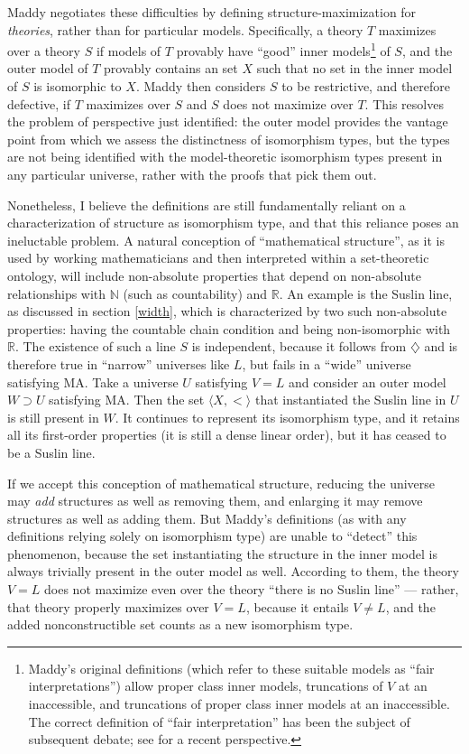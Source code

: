 \documentclass[letterpaper,12pt]{article}
\newcommand{\N}{\mathbb{N}}
\newcommand{\R}{\mathbb{R}}
\begin{document}
Maddy negotiates these difficulties by defining structure-maximization for \emph{theories}, rather than for particular models. Specifically, a theory $T$ maximizes over a theory $S$ if models of $T$ provably have ``good'' inner models\footnote{Maddy's original definitions (which refer to these suitable models as ``fair interpretations'') allow proper class inner models, truncations of $V$ at an inaccessible, and truncations of proper class inner models at an inaccessible. The correct definition of ``fair interpretation'' has been the subject of subsequent debate; see \cite{incurvati2016restrictiveness} for a recent perspective.} of $S$, and the outer model of $T$ provably contains an set $X$ such that no set in the inner model of $S$ is isomorphic to $X$. Maddy then considers $S$ to be restrictive, and therefore defective, if $T$ maximizes over $S$ and $S$ does not maximize over $T$. This resolves the problem of perspective just identified: the outer model provides the vantage point from which we assess the distinctness of isomorphism types, but the types are not being identified with the model-theoretic isomorphism types present in any particular universe, rather with the proofs that pick them out.

Nonetheless, I believe the definitions are still fundamentally reliant on a characterization of structure as isomorphism type, and that this reliance poses an ineluctable problem. A natural conception of ``mathematical structure'', as it is used by working mathematicians and then interpreted within a set-theoretic ontology, will include non-absolute properties that depend on non-absolute relationships with $\N$ (such as countability) and $\R$. An example is the Suslin line, as discussed in section \ref{width}, which is characterized by two such non-absolute properties: having the countable chain condition and being non-isomorphic with $\R$. The existence of such a line $S$ is independent, because it follows from $\diamondsuit$ and is therefore true in ``narrow'' universes like $L$, but fails in a ``wide'' universe satisfying $\mathrm{MA}$. Take a universe $U$ satisfying $V=L$ and consider an outer model $W \supset U$ satisfying $\mathrm{MA}$. Then the set $\langle X, < \rangle$ that instantiated the Suslin line in $U$ is still present in $W$. It continues to represent its isomorphism type, and it retains all its first-order properties (it is still a dense linear order), but it has ceased to be a Suslin line.

If we accept this conception of mathematical structure, reducing the universe may \emph{add} structures as well as removing them, and enlarging it may remove structures as well as adding them. But Maddy's definitions (as with any definitions relying solely on isomorphism type) are unable to ``detect'' this phenomenon, because the set instantiating the structure in the inner model is always trivially present in the outer model as well. According to them, the theory $V = L$ does not maximize even over the theory ``there is no Suslin line'' --- rather, that theory properly maximizes over $V = L$, because it entails $V \not = L$, and the added nonconstructible set counts as a new isomorphism type.
\end{document}
